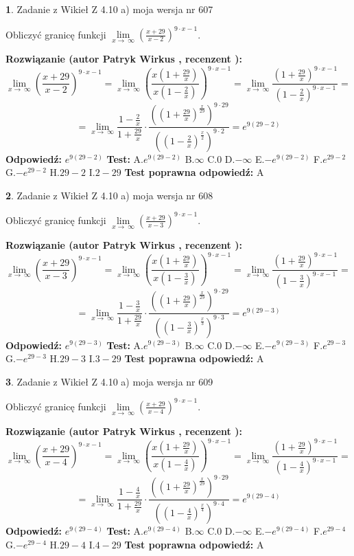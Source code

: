 \documentclass[12pt, a4paper]{article}
\theoremstyle{definition} %
\newtheorem{zad}{}
\newcommand{\zadStart}[1]{\begin{zad}#1\newline}
\newcommand{\zadStop}{\end{zad}}
\newcommand{\rozwStart}[2]{\noindent \textbf{Rozwiązanie (autor #1 , recenzent #2): }\newline}
\newcommand{\rozwStop}{\newline}
\newcommand{\odpStart}{\noindent \textbf{Odpowiedź:}\newline}
\newcommand{\odpStop}{\newline}
\newcommand{\testStart}{\noindent \textbf{Test:}\newline}
\newcommand{\testStop}{\newline}
\newcommand{\kluczStart}{\noindent \textbf{Test poprawna odpowiedź:}\newline}
\newcommand{\kluczStop}{\newline}
\begin{document}
\zadStart{Zadanie z Wikieł Z 4.10 a) moja wersja nr 607}


Obliczyć granicę funkcji  $\lim\limits_{x\to\ \infty}(\frac{x+29}{x-2})^{9\cdot x-1}$.
\zadStop
\rozwStart{Patryk Wirkus}{}
$$\lim\limits_{x\to\ \infty}(\frac{x+29}{x-2})^{9\cdot x-1} = \lim\limits_{x\to\ \infty}(\frac{x(1+\frac{29}{x})}{x(1-\frac{2}{x})})^{9\cdot x-1}=\lim\limits_{x\to\ \infty}\frac{(1+\frac{29}{x})^{9\cdot x-1}}{(1-\frac{2}{x})^{9\cdot x-1}}=$$
$$=\lim\limits_{x\to\ \infty}\frac{1-\frac{2}{x}}{1+\frac{29}{x}}\cdot\frac{((1+\frac{29}{x})^{\frac{x}{29}})^{9\cdot29}}{((1-\frac{2}{x})^{\frac{x}{2}})^{9\cdot2}}=e^{9(29-2)}$$
\rozwStop
\odpStart
$e^{9(29-2)}$
\odpStop
\testStart
A.$e^{9(29-2)}$ B.$\infty$ C.$0$ D.$-\infty$ E.$-e^{9(29-2)}$
F.$e^{29-2}$ G.$-e^{29-2}$
H.$29-2$
I.$2-29$
\testStop
\kluczStart
A
\kluczStop



\zadStart{Zadanie z Wikieł Z 4.10 a) moja wersja nr 608}


Obliczyć granicę funkcji  $\lim\limits_{x\to\ \infty}(\frac{x+29}{x-3})^{9\cdot x-1}$.
\zadStop
\rozwStart{Patryk Wirkus}{}
$$\lim\limits_{x\to\ \infty}(\frac{x+29}{x-3})^{9\cdot x-1} = \lim\limits_{x\to\ \infty}(\frac{x(1+\frac{29}{x})}{x(1-\frac{3}{x})})^{9\cdot x-1}=\lim\limits_{x\to\ \infty}\frac{(1+\frac{29}{x})^{9\cdot x-1}}{(1-\frac{3}{x})^{9\cdot x-1}}=$$
$$=\lim\limits_{x\to\ \infty}\frac{1-\frac{3}{x}}{1+\frac{29}{x}}\cdot\frac{((1+\frac{29}{x})^{\frac{x}{29}})^{9\cdot29}}{((1-\frac{3}{x})^{\frac{x}{3}})^{9\cdot3}}=e^{9(29-3)}$$
\rozwStop
\odpStart
$e^{9(29-3)}$
\odpStop
\testStart
A.$e^{9(29-3)}$ B.$\infty$ C.$0$ D.$-\infty$ E.$-e^{9(29-3)}$
F.$e^{29-3}$ G.$-e^{29-3}$
H.$29-3$
I.$3-29$
\testStop
\kluczStart
A
\kluczStop



\zadStart{Zadanie z Wikieł Z 4.10 a) moja wersja nr 609}


Obliczyć granicę funkcji  $\lim\limits_{x\to\ \infty}(\frac{x+29}{x-4})^{9\cdot x-1}$.
\zadStop
\rozwStart{Patryk Wirkus}{}
$$\lim\limits_{x\to\ \infty}(\frac{x+29}{x-4})^{9\cdot x-1} = \lim\limits_{x\to\ \infty}(\frac{x(1+\frac{29}{x})}{x(1-\frac{4}{x})})^{9\cdot x-1}=\lim\limits_{x\to\ \infty}\frac{(1+\frac{29}{x})^{9\cdot x-1}}{(1-\frac{4}{x})^{9\cdot x-1}}=$$
$$=\lim\limits_{x\to\ \infty}\frac{1-\frac{4}{x}}{1+\frac{29}{x}}\cdot\frac{((1+\frac{29}{x})^{\frac{x}{29}})^{9\cdot29}}{((1-\frac{4}{x})^{\frac{x}{4}})^{9\cdot4}}=e^{9(29-4)}$$
\rozwStop
\odpStart
$e^{9(29-4)}$
\odpStop
\testStart
A.$e^{9(29-4)}$ B.$\infty$ C.$0$ D.$-\infty$ E.$-e^{9(29-4)}$
F.$e^{29-4}$ G.$-e^{29-4}$
H.$29-4$
I.$4-29$
\testStop
\kluczStart
A
\kluczStop
\end{document}
